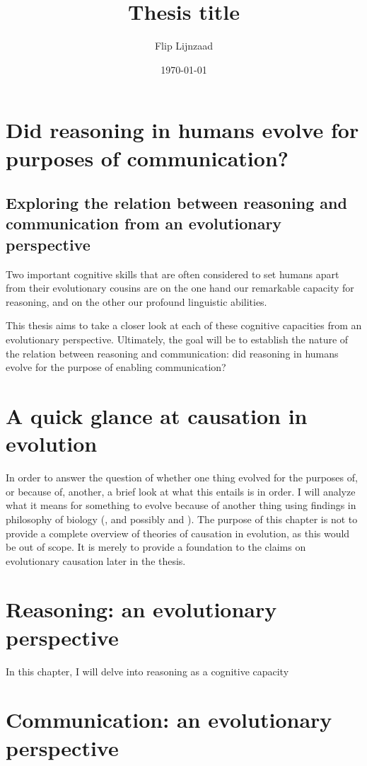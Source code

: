 \documentclass{article}
\title{Thesis title}
\author{Flip Lijnzaad}
\date{\today}
\begin{document}
\section*{\centering Did reasoning in humans evolve for purposes of communication?}
\subsection*{\centering Exploring the relation between reasoning and communication from an evolutionary perspective}
\medskip

Two important cognitive skills that are often considered to set humans apart from their evolutionary cousins are on the one hand our remarkable capacity for reasoning, and on the other our profound linguistic abilities.

This thesis aims to take a closer look at each of these cognitive capacities from an evolutionary perspective. Ultimately, the goal will be to establish the nature of the relation between reasoning and communication: did reasoning in humans evolve for the purpose of enabling communication?


\section{A quick glance at causation in evolution}

In order to answer the question of whether one thing evolved for the purposes of, or because of, another, a brief look at what this entails is in order.
I will analyze what it means for something to evolve because of another thing using findings in philosophy of biology (\citet{Ayala99}, and possibly \citet{Allen98} and \citet{Wright76}).
The purpose of this chapter is not to provide a complete overview of theories of causation in evolution, as this would be out of scope. It is merely to provide a foundation to the claims on evolutionary causation later in the thesis.

\section{Reasoning: an evolutionary perspective}

In this chapter, I will delve into reasoning as a cognitive capacity 

\section{Communication: an evolutionary perspective}
\end{document}
